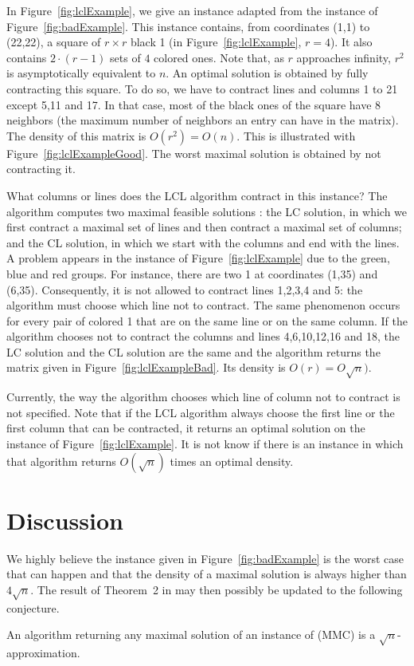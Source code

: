 In Figure~\ref{fig:lclExample}, we give an instance adapted from the instance of Figure~\ref{fig:badExample}. This instance contains, from coordinates (1,1) to (22,22),  a square of $r \times r$ black 1 (in Figure~\ref{fig:lclExample}, $r = 4$). It also contains $2 \cdot (r-1)$ sets of $4$ colored ones. Note that, as $r$ approaches infinity, $r^2$ is asymptotically equivalent to $n$. An optimal solution is obtained by fully contracting this square. To do so, we have to contract lines and columns 1 to 21 except 5,11 and 17. In that case, most of the black ones of the square have 8 neighbors (the maximum number of neighbors an entry can have in the matrix). The density of this matrix is $O(r^2) = O(n)$. This is illustrated with Figure~\ref{fig:lclExampleGood}. The worst maximal solution is obtained by not contracting it. 

What columns or lines does the LCL algorithm contract in this instance? The algorithm computes two maximal feasible solutions : the LC solution, in which we first contract a maximal set of lines and then contract a maximal set of columns; and the CL solution, in which we start with the columns and end with the lines. A problem appears in the instance of Figure~\ref{fig:lclExample} due to the green, blue and red groups. For instance, there are two 1 at coordinates (1,35) and (6,35). Consequently, it is not allowed to contract lines 1,2,3,4 and 5: the algorithm must choose which line not to contract. The same phenomenon occurs for every pair of colored 1 that are on the same line or on the same column. If the algorithm chooses not to contract the columns and lines 4,6,10,12,16 and 18, the LC solution and the CL solution are the same and the algorithm returns the matrix given in Figure~\ref{fig:lclExampleBad}. Its density is $O(r) = O\sqrt{n})$.

\begin{remark}
	Currently, the way the algorithm chooses which line of column not to contract is not specified. Note that if the LCL algorithm always choose the first line or the first column that can be contracted, it returns an optimal solution on the instance of Figure~\ref{fig:lclExample}. It is not know if there is an instance in which that algorithm returns $O(\sqrt{n})$ times an optimal density. 
\end{remark}





\section{Discussion}

We highly believe the instance given in Figure~\ref{fig:badExample} is the worst case that can happen and that the density of a maximal solution is always higher than $4\sqrt{n}$. The result of Theorem~2 in \cite{WP16} may then possibly be updated to the following conjecture. 

\begin{conjecture}
	An algorithm returning any maximal solution of an instance of (MMC) is a $\sqrt{n}$-approximation.
\end{conjecture}
